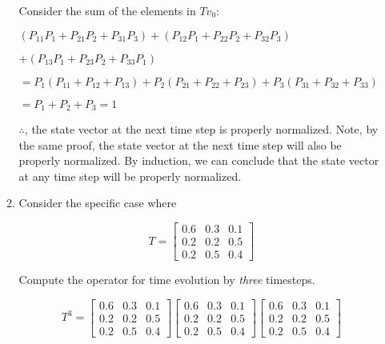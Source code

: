 \documentclass[fleqn]{article}
\makeatletter
\newenvironment{equationCenter}{\@fleqnfalse\begin{equation*}}{\end{equation*}}
\makeatother
\begin{document}
\begin{enumerate}[nolistsep]
\begin{enumerate}
			Consider the sum of the elements in $Tv_0$:
			
			$(P_{11}P_{1} + P_{21}P_{2} + P_{31}P_{3}) + (P_{12}P_{1} + P_{22}P_{2} + P_{32}P_{3})$
			
			$ + (P_{13}P_{1} + P_{23}P_{2} + P_{33}P_{1})$
			
			$ = P_{1}(P_{11} + P_{12} + P_{13}) + P_{2}(P_{21} + P_{22} + P_{23}) + P_{3}(P_{31} + P_{32} + P_{33})$
			
			$ = P_{1} + P_{2} + P_{3} = 1$
			
			$\therefore$, the state vector at the next time step is properly normalized. Note, by the same proof, the state vector at the next time step will also be properly normalized. By induction, we can conclude that the state vector at any time step will be properly normalized.
			 
			\item Consider the specific case where
			
			\begin{equationCenter}
				T = \begin{bmatrix}
					0.6 & 0.3 & 0.1\\
					0.2 & 0.2 & 0.5\\
					0.2 & 0.5 & 0.4
				\end{bmatrix}
			\end{equationCenter}
			
			Compute the operator for time evolution by \textit{three} timesteps.
			
			\begin{equation*}
				T^3 = \begin{bmatrix}
					0.6 & 0.3 & 0.1\\
					0.2 & 0.2 & 0.5\\
					0.2 & 0.5 & 0.4
				\end{bmatrix}\begin{bmatrix}
					0.6 & 0.3 & 0.1\\
					0.2 & 0.2 & 0.5\\
					0.2 & 0.5 & 0.4
				\end{bmatrix}\begin{bmatrix}
					0.6 & 0.3 & 0.1\\
					0.2 & 0.2 & 0.5\\
					0.2 & 0.5 & 0.4
				\end{bmatrix}
			\end{equation*}
			

\end{enumerate}
\end{enumerate}
\end{document}
